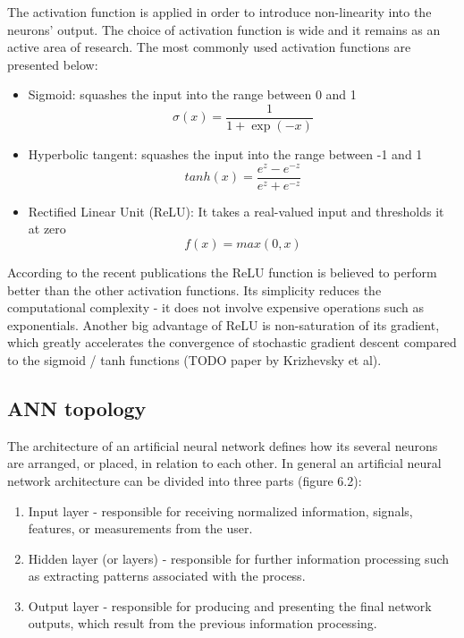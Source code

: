 The activation function is applied in order to introduce non-linearity into the neurons' output. The choice of activation function is wide and it remains as an active area of research. The most commonly used activation functions are presented below: 

\begin{itemize}
\itemsep0em 
\item Sigmoid: squashes the input into the range between 0 and 1 
\begin{equation}
\sigma (x) = \frac{1}{1+\exp(-x)} 
\end{equation}
\item Hyperbolic tangent: squashes the input into the range between -1 and 1
\begin{equation}
tanh(x) = \frac{e^{z} - e^{-z}}{e^{z} + e^{-z}}
\end{equation}
\item Rectified Linear Unit (ReLU): It takes a real-valued input and thresholds it at zero
\begin{equation}
f(x) = max(0, x)
\end{equation}
\end{itemize}

According to the recent publications the ReLU function is believed to perform better than the other activation functions. Its simplicity reduces the computational complexity - it does not involve expensive operations such as exponentials. Another big advantage of ReLU is non-saturation of its gradient, which greatly accelerates the convergence of stochastic gradient descent compared to the sigmoid / tanh functions (TODO paper by Krizhevsky et al).


\subsection{ANN topology}

The architecture of an artificial neural network defines how its several neurons are arranged, or placed, in relation to each other. In general an artificial neural network architecture can be divided into three parts (figure 6.2):

\begin{enumerate}
\itemsep0em 
\item Input layer - responsible for receiving normalized information, signals, features, or measurements from the user.
\item Hidden layer (or layers) - responsible for further information processing such as extracting patterns associated with the process. 
\item Output layer - responsible for producing and presenting the final network outputs, which result from the previous information processing.
\end{enumerate}

